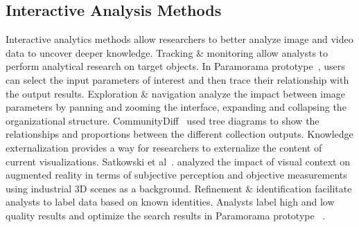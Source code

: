 \documentclass[a4paper,fleqn]{cas-dc}
\begin{document}
\subsection{Interactive Analysis Methods}
Interactive analytics methods allow researchers to better analyze image and video data to uncover deeper knowledge. 
Tracking \& monitoring allow analysts to perform analytical research on target objects. 
In Paramorama prototype~\cite{Pretorius2011}, users can select the input parameters of interest and then trace their relationship with the output results.
Exploration \& navigation analyze the impact between image parameters by panning and zooming the interface, expanding and collapsing the organizational structure.
CommunityDiff~\cite{Datta2018} used tree diagrams to show the relationships and proportions between the different collection outputs.
Knowledge externalization provides a way for researchers to externalize the content of current visualizations. 
Satkowski et al~\cite{Satkowski2021}. analyzed the impact of visual context on augmented reality in terms of subjective perception and objective measurements using industrial 3D scenes as a background.
Refinement \& identification facilitate analysts to label data based on known identities.
Analysts label high and low quality results and optimize the search results in Paramorama prototype~\cite{Pretorius2011} .  
\end{document}
